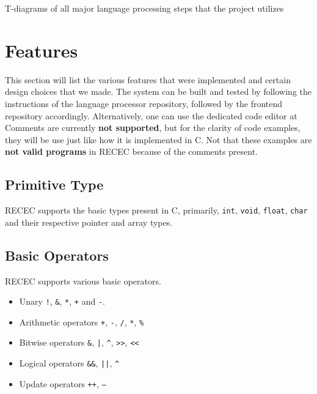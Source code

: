 \documentclass[a4paper]{article}
\begin{document}
T-diagrams of all major language processing steps that the project utilizes

\section{Features}


This section will list the various features that were implemented and certain design choices that we made. The system can be built and tested by following the instructions of the language processor repository, followed by the frontend repository accordingly. Alternatively, one can use the dedicated code editor at %
\\

Comments are currently \textbf{not supported}, but for the clarity of code examples, they will be use just like how it is implemented in C. Not that these examples are \textbf{not valid programs} in RECEC because of the comments present.  

\subsection{Primitive Type}
RECEC supports the basic types present in C, primarily, \texttt{int}, \texttt{void}, \texttt{float}, \texttt{char} and their respective pointer and array types.

\subsection{Basic Operators}
RECEC supports various basic operators.

\begin{itemize}
	\item Unary \texttt{!}, \texttt{\&}, \texttt{*}, \texttt{+} and \texttt{-}.
	\item Arithmetic operators \texttt{+}, \texttt{-}, \texttt{/}, \texttt{*}, \texttt{\%}
	\item Bitwise operators \texttt{\&}, \texttt{|}, \texttt{\^},  \texttt{>>}, \texttt{<<}
	\item Logical operators \texttt{\&\&}, \texttt{||}, \texttt{\^}
	\item Update operators \texttt{++}, \texttt{--}
\end{itemize}
\end{document}
